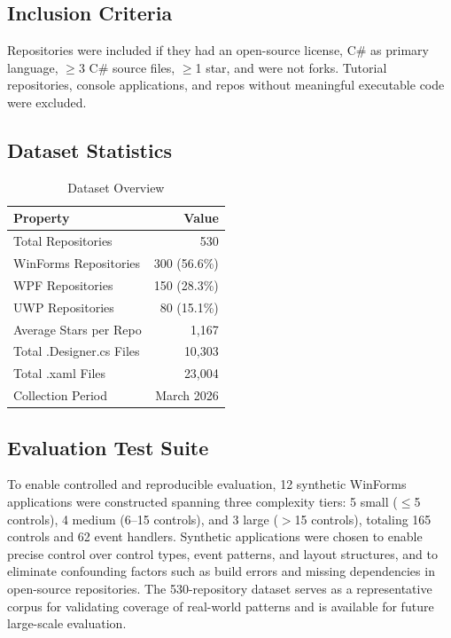 \documentclass[conference]{IEEEtran}
\begin{document}
\subsection{Inclusion Criteria}

Repositories were included if they had an open-source license, C\# as primary language, $\geq$3 C\# source files, $\geq$1 star, and were not forks. Tutorial repositories, console applications, and repos without meaningful executable code were excluded.

\subsection{Dataset Statistics}

\begin{table}[h]
\caption{Dataset Overview}
\label{tab:dataset}
\centering
\begin{tabular}{lr}
\toprule
\textbf{Property} & \textbf{Value} \\
\midrule
Total Repositories & 530 \\
WinForms Repositories & 300 (56.6\%) \\
WPF Repositories & 150 (28.3\%) \\
UWP Repositories & 80 (15.1\%) \\
Average Stars per Repo & 1,167 \\
Total .Designer.cs Files & 10,303 \\
Total .xaml Files & 23,004 \\
Collection Period & March 2026 \\
\bottomrule
\end{tabular}
\end{table}

\subsection{Evaluation Test Suite}

To enable controlled and reproducible evaluation, 12 synthetic WinForms applications were constructed spanning three complexity tiers: 5 small ($\leq$5 controls), 4 medium (6--15 controls), and 3 large ($>$15 controls), totaling 165 controls and 62 event handlers. Synthetic applications were chosen to enable precise control over control types, event patterns, and layout structures, and to eliminate confounding factors such as build errors and missing dependencies in open-source repositories. The 530-repository dataset serves as a representative corpus for validating coverage of real-world patterns and is available for future large-scale evaluation.
\end{document}
